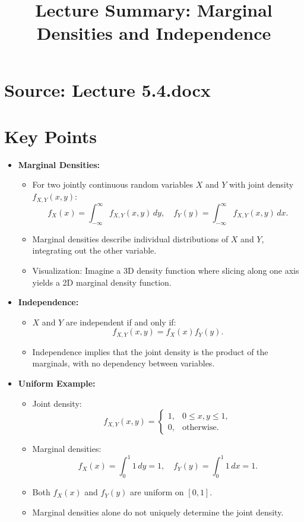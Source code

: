 \documentclass{article}
\title{Lecture Summary: Marginal Densities and Independence}
\author{}
\date{}
\begin{document}
\maketitle

\section*{Source: Lecture 5.4.docx}

\section*{Key Points}

\begin{itemize}
  \item \textbf{Marginal Densities:}
    \begin{itemize}
      \item For two jointly continuous random variables $X$ and $Y$ with joint density $f_{X,Y}(x,y)$:
        \[
          f_X(x) = \int_{-\infty}^\infty f_{X,Y}(x,y) \, dy, \quad f_Y(y) = \int_{-\infty}^\infty f_{X,Y}(x,y) \, dx.
        \]
      \item Marginal densities describe individual distributions of $X$ and $Y$, integrating out the other variable.
      \item Visualization: Imagine a 3D density function where slicing along one axis yields a 2D marginal density function.
    \end{itemize}

  \item \textbf{Independence:}
    \begin{itemize}
      \item $X$ and $Y$ are independent if and only if:
        \[
          f_{X,Y}(x,y) = f_X(x)f_Y(y).
        \]
      \item Independence implies that the joint density is the product of the marginals, with no dependency between variables.
    \end{itemize}

  \item \textbf{Uniform Example:}
    \begin{itemize}
      \item Joint density:
        \[
          f_{X,Y}(x,y) =
          \begin{cases}
            1, & 0 \leq x, y \leq 1, \\
            0, & \text{otherwise}.
          \end{cases}
        \]
      \item Marginal densities:
        \[
          f_X(x) = \int_0^1 1 \, dy = 1, \quad f_Y(y) = \int_0^1 1 \, dx = 1.
        \]
      \item Both $f_X(x)$ and $f_Y(y)$ are uniform on $[0, 1]$.
      \item Marginal densities alone do not uniquely determine the joint density.
    \end{itemize}


\end{itemize}
\end{document}
